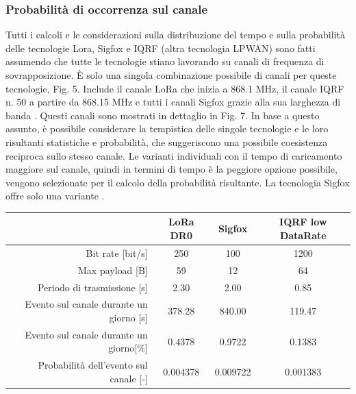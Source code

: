 \documentclass[a4paper]{report} %
\begin{document}
\subsubsection{Probabilità di occorrenza sul canale}
Tutti i calcoli e le considerazioni sulla distribuzione del tempo e sulla probabilità delle tecnologie Lora, Sigfox e IQRF (altra tecnologia LPWAN) sono fatti assumendo che tutte le tecnologie stiano lavorando su canali di frequenza di sovrapposizione. È solo una singola combinazione possibile di canali per queste tecnologie, Fig. 5. Include il canale LoRa che inizia a 868.1 MHz, il canale IQRF n. 50 a partire da 868.15 MHz e tutti i canali Sigfox grazie alla sua larghezza di banda \cite{art:rif.45}. 
Questi canali sono mostrati in dettaglio in Fig. 7. In base a questo assunto, è possibile considerare la tempistica delle singole tecnologie e le loro risultanti statistiche e probabilità, che suggeriscono una possibile coesistenza reciproca sullo stesso canale. Le varianti individuali con il tempo di caricamento maggiore sul canale, quindi in termini di tempo è la peggiore opzione possibile, vengono selezionate per il calcolo della probabilità risultante. La tecnologia Sigfox offre solo una variante \cite{art:rif.46}.
\begin{center}
\begin{tabular}{r|c|c|c|}
&LoRa DR0&Sigfox&IQRF low DataRate\\ \hline
Bit rate [bit/s]&250&100&1200\\ \hline
Max payload [B]&59&12&64\\ \hline
Periodo di trasmissione [s]&2.30&2.00&0.85\\ \hline
Evento sul canale durante un giorno [s]&378.28&840.00&119.47\\ \hline
Evento sul canale durante un giorno[\%]&0.4378&0.9722&0.1383\\ \hline
Probabilità dell'evento sul canale [-]&0.004378&0.009722&0.001383\\ \hline
\end{tabular}
\end{center}
\end{document}
